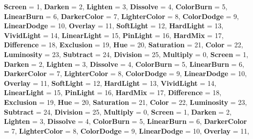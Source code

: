 \begin{DoxyCompactItemize}
{\bfseries Screen} = 1, 
{\bfseries Darken} = 2, 
{\bfseries Lighten} = 3, 
\newline
{\bfseries Dissolve} = 4, 
{\bfseries Color\+Burn} = 5, 
{\bfseries Linear\+Burn} = 6, 
{\bfseries Darker\+Color} = 7, 
\newline
{\bfseries Lighter\+Color} = 8, 
{\bfseries Color\+Dodge} = 9, 
{\bfseries Linear\+Dodge} = 10, 
{\bfseries Overlay} = 11, 
\newline
{\bfseries Soft\+Light} = 12, 
{\bfseries Hard\+Light} = 13, 
{\bfseries Vivid\+Light} = 14, 
{\bfseries Linear\+Light} = 15, 
\newline
{\bfseries Pin\+Light} = 16, 
{\bfseries Hard\+Mix} = 17, 
{\bfseries Difference} = 18, 
{\bfseries Exclusion} = 19, 
\newline
{\bfseries Hue} = 20, 
{\bfseries Saturation} = 21, 
{\bfseries Color} = 22, 
{\bfseries Luminosity} = 23, 
\newline
{\bfseries Subtract} = 24, 
{\bfseries Division} = 25, 
{\bfseries Multiply} = 0, 
{\bfseries Screen} = 1, 
\newline
{\bfseries Darken} = 2, 
{\bfseries Lighten} = 3, 
{\bfseries Dissolve} = 4, 
{\bfseries Color\+Burn} = 5, 
\newline
{\bfseries Linear\+Burn} = 6, 
{\bfseries Darker\+Color} = 7, 
{\bfseries Lighter\+Color} = 8, 
{\bfseries Color\+Dodge} = 9, 
\newline
{\bfseries Linear\+Dodge} = 10, 
{\bfseries Overlay} = 11, 
{\bfseries Soft\+Light} = 12, 
{\bfseries Hard\+Light} = 13, 
\newline
{\bfseries Vivid\+Light} = 14, 
{\bfseries Linear\+Light} = 15, 
{\bfseries Pin\+Light} = 16, 
{\bfseries Hard\+Mix} = 17, 
\newline
{\bfseries Difference} = 18, 
{\bfseries Exclusion} = 19, 
{\bfseries Hue} = 20, 
{\bfseries Saturation} = 21, 
\newline
{\bfseries Color} = 22, 
{\bfseries Luminosity} = 23, 
{\bfseries Subtract} = 24, 
{\bfseries Division} = 25, 
\newline
{\bfseries Multiply} = 0, 
{\bfseries Screen} = 1, 
{\bfseries Darken} = 2, 
{\bfseries Lighten} = 3, 
\newline
{\bfseries Dissolve} = 4, 
{\bfseries Color\+Burn} = 5, 
{\bfseries Linear\+Burn} = 6, 
{\bfseries Darker\+Color} = 7, 
\newline
{\bfseries Lighter\+Color} = 8, 
{\bfseries Color\+Dodge} = 9, 
{\bfseries Linear\+Dodge} = 10, 
{\bfseries Overlay} = 11, 
\newline

\end{DoxyCompactItemize}
